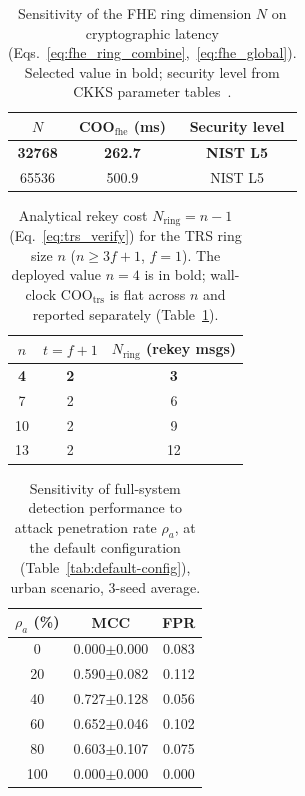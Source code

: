\documentclass[12pt, a4paper]{report}
\begin{document}
\begin{table}[H]
\centering
\caption{Sensitivity of the FHE ring dimension $N$ on
cryptographic latency
(Eqs.~\ref{eq:fhe_ring_combine},~\ref{eq:fhe_global}).
Selected value in bold; security level from CKKS parameter
tables~\cite{openFHE}.}
\label{tab:ringdim-sensitivity}
\renewcommand{\arraystretch}{1.2}
\begin{tabular}{|c|c|c|}
\hline
\textbf{$N$} &
\textbf{COO$_{\mathrm{fhe}}$ (ms)} & \textbf{Security level} \\
\hline
\textbf{32768} & \textbf{262.7} & \textbf{NIST L5} \\
\hline
65536          & 500.9          & NIST L5 \\
\hline
\end{tabular}
\end{table}


\begin{table}[H]
\centering
\caption{Analytical rekey cost $N_{\mathrm{ring}} = n{-}1$
(Eq.~\ref{eq:trs_verify}) for the TRS ring size $n$
($n \geq 3f{+}1$, $f=1$). The deployed value $n=4$ is in bold;
wall-clock COO$_{\mathrm{trs}}$ is flat across $n$ and reported
separately (Table~\ref{tab:ringdim-sensitivity}).}
\label{tab:trsring-sensitivity}
\renewcommand{\arraystretch}{1.2}
\begin{tabular}{|c|c|c|}
\hline
\textbf{$n$} & \textbf{$t = f{+}1$} &
\textbf{$N_{\mathrm{ring}}$ (rekey msgs)} \\
\hline
\textbf{4}  & \textbf{2} & \textbf{3} \\
\hline
7           & 2          & 6 \\
\hline
10          & 2          & 9 \\
\hline
13          & 2          & 12 \\
\hline
\end{tabular}
\end{table}


\begin{table}[H]
\centering
\caption{Sensitivity of full-system detection performance to attack
penetration rate $\rho_a$, at the default configuration
(Table~\ref{tab:default-config}), urban scenario, 3-seed average.}
\label{tab:attackpct-sensitivity}
\renewcommand{\arraystretch}{1.2}
\begin{tabular}{|c|c|c|}
\hline
\textbf{$\rho_a$ (\%)} & \textbf{MCC} & \textbf{FPR} \\
\hline
0   & 0.000$\pm$0.000 & 0.083 \\
\hline
20  & 0.590$\pm$0.082 & 0.112 \\
\hline
40  & 0.727$\pm$0.128 & 0.056 \\
\hline
60  & 0.652$\pm$0.046 & 0.102 \\
\hline
80  & 0.603$\pm$0.107 & 0.075 \\
\hline
100 & 0.000$\pm$0.000 & 0.000 \\
\hline
\end{tabular}
\end{table}
\end{document}
